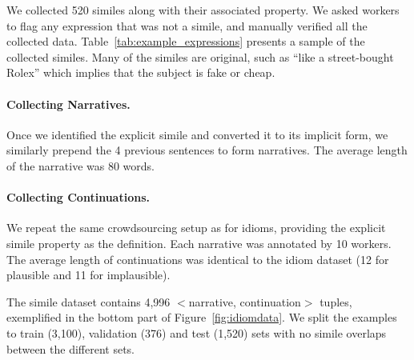 

We collected 520 similes along with their associated property. We asked workers to flag any expression that was not a simile, and manually verified all the collected data. Table~\ref{tab:example_expressions} presents a sample of the collected similes. Many of the similes are original, such as ``like a street-bought Rolex'' which implies that the subject is fake or cheap.

\paragraph{Collecting Narratives.} Once we identified the explicit simile and converted it to its implicit form, we similarly prepend the 4 previous sentences to form narratives. The average length of the narrative was 80 words.

\paragraph{Collecting Continuations.} We repeat the same crowdsourcing setup as for idioms, providing the explicit simile property as the definition. Each narrative was annotated by 10 workers. The average length of continuations was identical to the idiom dataset (12 for plausible and 11 for implausible).

The simile dataset contains 4,996 $\lt$narrative, continuation$\gt$ tuples, exemplified in the bottom part of Figure~\ref{fig:idiomdata}. We split the examples to train (3,100), validation (376) and test (1,520) sets with no simile overlaps between the different sets.